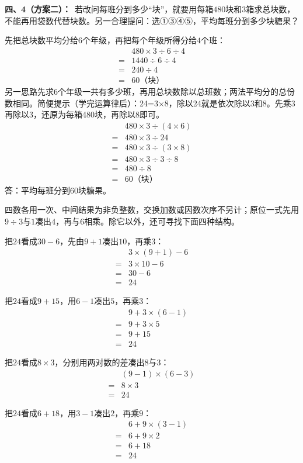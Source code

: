 \documentclass[multi=snippet,border=0pt]{standalone}
\newenvironment{snippet}[3]{\begin{minipage}{#1bp}\color{answerred}\fontsize{#2}{#3}\selectfont\raggedright}{\end{minipage}}
\begin{document}
\begin{snippet}{505}{11.5}{14}\textbf{四、4（方案二）：}\ 若改问每班分到多少“块”，就要用每箱\(480\)块和\(3\)箱求总块数，不能再用袋数代替块数。另一合理提问：选①③④⑤，平均每班分到多少块糖果？\par 先把总块数平均分给\(6\)个年级，再把每个年级所得分给\(4\)个班：\[\begin{aligned}&480\times3\div6\div4\\={}&1440\div6\div4\\={}&240\div4\\={}&60\text{（块）}\end{aligned}\]另一思路先求\(6\)个年级一共有多少班，再用总块数除以总班数；两法平均分的总份数相同。简便提示（学完运算律后）：24=3×8，除以24就是依次除以3和8。先乘3再除以3，还原为每箱480块，再除以8即可。\[\begin{aligned}&480\times3\div(4\times6)\\={}&480\times3\div24\\={}&480\times3\div(3\times8)\\={}&480\times3\div3\div8\\={}&480\div8\\={}&60\text{（块）}\end{aligned}\]答：平均每班分到60块糖果。\end{snippet}
\begin{snippet}{505}{11.5}{14}四数各用一次、中间结果为非负整数，交换加数或因数次序不另计；原位一式先用\(9\div3\)与\(1\)凑出\(4\)，再与\(6\)相乘。除它以外，还可寻找下面四种结构。\par 把\(24\)看成\(30-6\)，先由\(9+1\)凑出\(10\)，再乘\(3\)：\[\begin{aligned}&3\times(9+1)-6\\={}&3\times10-6\\={}&30-6\\={}&24\end{aligned}\]\par 把\(24\)看成\(9+15\)，用\(6-1\)凑出\(5\)，再乘\(3\)：\[\begin{aligned}&9+3\times(6-1)\\={}&9+3\times5\\={}&9+15\\={}&24\end{aligned}\]\par 把\(24\)看成\(8\times3\)，分别用两对数的差凑出\(8\)与\(3\)：\[\begin{aligned}&(9-1)\times(6-3)\\={}&8\times3\\={}&24\end{aligned}\]\par 把\(24\)看成\(6+18\)，用\(3-1\)凑出\(2\)，再乘\(9\)：\[\begin{aligned}&6+9\times(3-1)\\={}&6+9\times2\\={}&6+18\\={}&24\end{aligned}\]\end{snippet}
\end{document}
